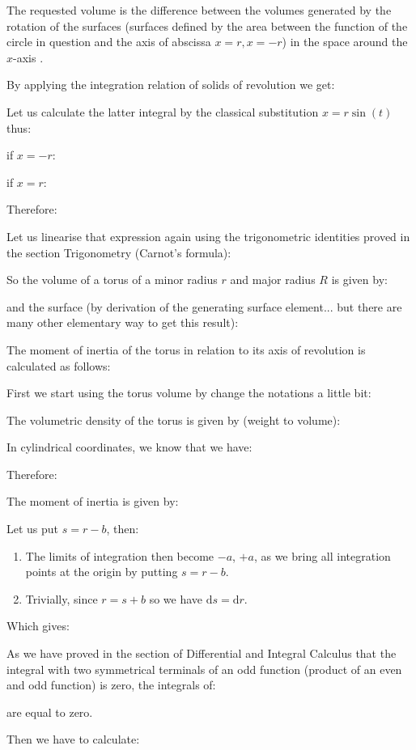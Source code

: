 {	The requested volume is the difference between the volumes generated by the rotation of the surfaces (surfaces defined by the area between the function of the circle in question and the axis of abscissa $x=r,x=-r$) in the space around the $x$-axis .

	By applying the integration relation of solids of revolution we get:
	
	Let us calculate the latter integral by the classical substitution $x=r\sin(t)$  thus:
	
	if $x=-r$:
	
	if $x=r$:
	
	Therefore:
	
	Let us linearise that expression again using the trigonometric identities proved in the section Trigonometry (Carnot's formula):
	
	So the volume of a torus of a minor radius $r$ and major radius $R$ is given by:
	
	and the surface (by derivation of the generating surface element... but there are many other elementary way to get this result):
	
	The moment of inertia of the torus in relation to its axis of revolution is calculated as follows:

	First we start using the torus volume by change the notations a little bit:
	
	The volumetric density of the torus is given by (weight to volume):
	
	In cylindrical coordinates, we know that we have:
	
	Therefore:
	
	The moment of inertia is given by:
	
	Let us put $s=r-b$, then:
	\begin{enumerate}
		\item The limits of integration then become $-a$, $+ a$, as we bring all integration points at the origin by putting $s=r-b$.

		\item Trivially, since $r=s+b$ so we have $\mathrm{d}s=\mathrm{d}r$.
	\end{enumerate}
	Which gives:
	
	As we have proved in the section of Differential and Integral Calculus that the integral with two symmetrical terminals of an odd function (product of an even and odd function) is zero, the integrals of:
	
	are equal to zero.

	Then we have to calculate:
	
}
